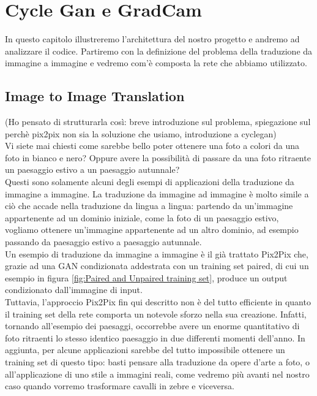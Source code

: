 \chapter{Cycle Gan e GradCam}
In questo capitolo illustreremo l'architettura del nostro progetto e andremo ad analizzare il codice. Partiremo con la definizione del problema della traduzione da immagine a immagine e vedremo com'è composta la rete che abbiamo utilizzato.

\section{Image to Image Translation}
(Ho pensato di strutturarla così: breve introduzione sul problema, spiegazione sul perchè pix2pix non sia la soluzione che usiamo, introduzione a cyclegan)\\
Vi siete mai chiesti come sarebbe bello poter ottenere una foto a colori da una foto in bianco e nero? Oppure avere la possibilità di passare da una foto ritraente un paesaggio estivo a un paesaggio autunnale?
\\Questi sono solamente alcuni degli esempi di applicazioni della traduzione da immagine a immagine. La traduzione da immagine ad immagine è molto simile a ciò che accade nella traduzione da lingua a lingua: partendo da un'immagine appartenente ad un dominio iniziale, come la foto di un paesaggio estivo, vogliamo ottenere un'immagine appartenente ad un altro dominio, ad esempio passando da paesaggio estivo a paesaggio autunnale.
\\Un esempio di traduzione da immagine a immagine è il già trattato Pix2Pix che, grazie ad una GAN condizionata addestrata con un training set paired, di cui un esempio in figura \ref{fig:Paired and Unpaired training set}, produce un output condizionato dall'immagine di input.
\\Tuttavia, l'approccio Pix2Pix fin qui descritto non è del tutto efficiente in quanto il training set della rete comporta un notevole sforzo nella sua creazione. Infatti, tornando all'esempio dei paesaggi, occorrebbe avere un enorme quantitativo di foto ritraenti lo stesso identico paesaggio in due differenti momenti dell'anno. In aggiunta, per alcune applicazioni sarebbe del tutto impossibile ottenere un training set di questo tipo: basti pensare alla traduzione da opere d'arte a foto, o all'applicazione di uno stile a immagini reali, come vedremo più avanti nel nostro caso quando vorremo trasformare cavalli in zebre e viceversa.

